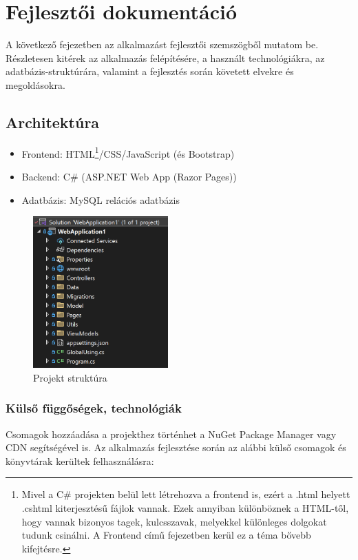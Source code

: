 \chapter{Fejlesztői dokumentáció}
\label{ch:impl}
 A következő fejezetben az alkalmazást fejlesztői szemszögből mutatom be. Részletesen kitérek az alkalmazás felépítésére, a használt technológiákra, az adatbázis-struktúrára, valamint a fejlesztés során követett elvekre és megoldásokra.

\section{Architektúra}
\begin{itemize}
	\item Frontend: HTML\footnote{Mivel a C\# projekten
		belül lett létrehozva a frontend is, ezért a .html helyett .cshtml
		kiterjesztésű fájlok vannak. Ezek annyiban különböznek a 
		HTML-től, hogy vannak bizonyos tagek, kulcsszavak, melyekkel
		különleges dolgokat tudunk csinálni. A Frontend című fejezetben kerül ez a téma bővebb kifejtésre.}/CSS/JavaScript (és Bootstrap)
	\item Backend: C\# (ASP.NET Web App (Razor Pages))
	\item Adatbázis: MySQL relációs adatbázis
\end{itemize}

\begin{figure}[H]
	\centering
	\includegraphics[height=220px]{img/solution-explorer-screenshot}
	\caption{Projekt struktúra}
	\label{fig:project-structure}
\end{figure}

\subsection{Külső függőségek, technológiák}

Csomagok hozzáadása a projekthez történhet a NuGet Package Manager vagy CDN segítségével is. Az alkalmazás fejlesztése során az alábbi külső csomagok és könyvtárak kerültek felhasználásra:

